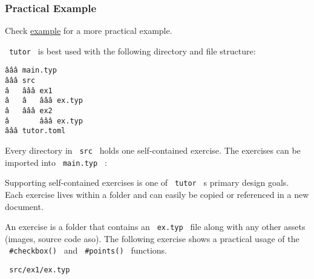 \subsubsection{Practical Example}\label{practical-example}

Check
\href{https://github.com/rangerjo/tutor/tree/main/example}{example} for
a more practical example.

\texttt{\ tutor\ } is best used with the following directory and file
structure:

\begin{verbatim}
âââ main.typ
âââ src
â   âââ ex1
â   â   âââ ex.typ
â   âââ ex2
â       âââ ex.typ
âââ tutor.toml
\end{verbatim}

Every directory in \texttt{\ src\ } holds one self-contained exercise.
The exercises can be imported into \texttt{\ main.typ\ } :

\begin{Shaded}
\begin{Highlighting}[]



\end{Highlighting}
\end{Shaded}

Supporting self-contained exercises is one of \texttt{\ tutor\ } s
primary design goals. Each exercise lives within a folder and can easily
be copied or referenced in a new document.

An exercise is a folder that contains an \texttt{\ ex.typ\ } file along
with any other assets (images, source code aso). The following exercise
shows a practical usage of the \texttt{\ \#checkbox()\ } and
\texttt{\ \#points()\ } functions.

\texttt{\ src/ex1/ex.typ\ }

\begin{Shaded}
\begin{Highlighting}[]

\NormalTok{\#let exercise(cfg) = [}



\NormalTok{\}}
\NormalTok{]}
\end{Highlighting}
\end{Shaded}

